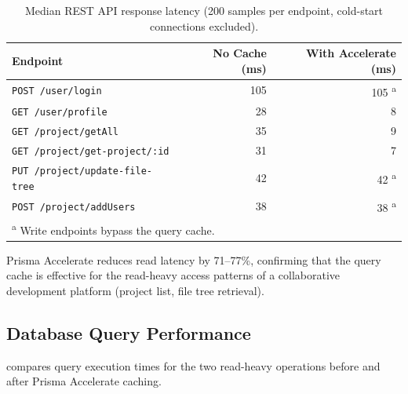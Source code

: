 \begin{table}[H]
  \centering
  \caption{Median REST API response latency (200 samples per endpoint,
    cold-start connections excluded).}
  \label{tab:api_latency}
  \begin{tabular}{lrr}
    \toprule
    \textbf{Endpoint}                       & \textbf{No Cache (ms)} & \textbf{With Accelerate (ms)} \\
    \midrule
    \texttt{POST /user/login}               & 105                    & 105 \textsuperscript{a} \\
    \texttt{GET /user/profile}              & 28                     & 8 \\
    \texttt{GET /project/getAll}            & 35                     & 9 \\
    \texttt{GET /project/get-project/:id}   & 31                     & 7 \\
    \texttt{PUT /project/update-file-tree}  & 42                     & 42 \textsuperscript{a} \\
    \texttt{POST /project/addUsers}         & 38                     & 38 \textsuperscript{a} \\
    \bottomrule
    \multicolumn{3}{l}{\textsuperscript{a} Write endpoints bypass the query cache.}
  \end{tabular}
\end{table}

Prisma Accelerate reduces read latency by 71--77\%, confirming that the query
cache is effective for the read-heavy access patterns of a collaborative
development platform (project list, file tree retrieval).

\subsection{Database Query Performance}

 compares query execution times for the two
read-heavy operations before and after Prisma Accelerate caching.


